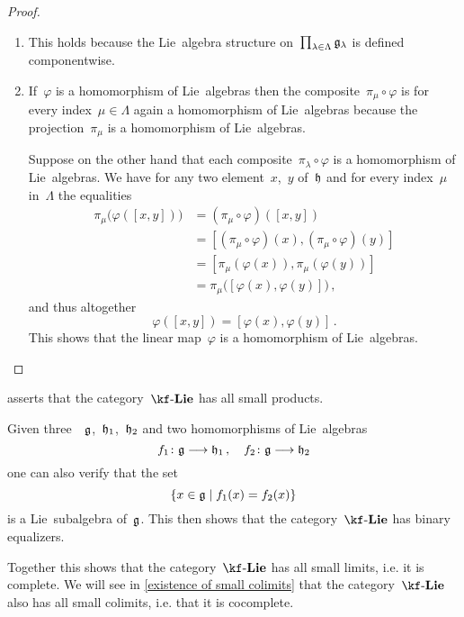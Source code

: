 \begin{proof}
  \leavevmode
  \begin{enumerate}
    \item
      This holds because the Lie~algebra structure on~$\prod_{\lambda \in \Lambda} \mathfrak{g}_{\lambda}$ is defined componentwise.
    \item
      If~$\varphi$ is a homomorphism of Lie~algebras then the composite~$\pi_\mu \circ \varphi$ is for every index~$\mu \in \Lambda$ again a homomorphism of Lie~algebras because the projection~$\pi_\mu$ is a homomorphism of Lie~algebras.

      Suppose on the other hand that each composite~$\pi_\lambda \circ \varphi$ is a homomorphism of Lie~algebras.
      We have for any two element~$x$,~$y$ of~$\mathfrak{h}$ and for every index~$\mu$ in~$\Lambda$ the equalities
      \begin{align*}
        \pi_\mu\bigl( \varphi( [ x, y ] ) \bigr)
        &=
        (\pi_\mu \circ \varphi)( [x, y] )
        \\
        &=
        [ (\pi_\mu \circ \varphi)(x), (\pi_\mu \circ \varphi)(y) ]
        \\
        &=
        [ \pi_\mu( \varphi(x) ), \pi_\mu( \varphi(y) ) ]
        \\
        &=
        \pi_\mu\bigl( [\varphi(x), \varphi(y)] \bigr) \,,
      \end{align*}
      and thus altogether
      \[
        \varphi( [x,y] ) = [ \varphi(x), \varphi(y) ] \,.
      \]
      This shows that the linear map~$\varphi$ is a homomorphism of Lie~algebras.
    \qedhere
  \end{enumerate}
\end{proof}


\begin{remark}
   asserts that the category~$\cLie{\kf}$ has all small products.

  Given three~\liealgebras{$\kf$}~$\mathfrak{g}$,~$\mathfrak{h}_1$,~$\mathfrak{h}_2$ and two homomorphisms of Lie~algebras
  \[
    f_1 \colon \glie \to \hlie_1 \,,
    \quad
    f_2 \colon \glie \to \hlie_2
  \]
  one can also verify that the set
  \[
    \{
      x \in \glie
    \suchthat
      f_1(x) = f_2(x)
    \}
  \]
  is a Lie~subalgebra of~$\mathfrak{g}$.
  This then shows that the category~$\cLie{\kf}$ has binary equalizers.

  Together this shows that the category~$\cLie{\kf}$ has all small limits, i.e. it is complete.
  We will see in \cref{existence of small colimits} that the category~$\cLie{\kf}$ also has all small colimits, i.e. that it is cocomplete.
\end{remark}


